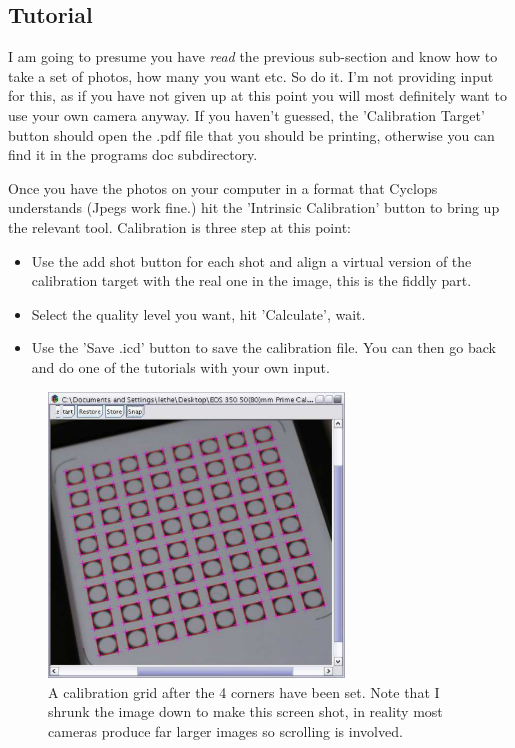 \documentclass[10pt,a4paper,twoside]{article}
\begin{document}
\subsection{Tutorial}

I am going to presume you have \emph{read} the previous sub-section and know how to take a set of photos, how many you want etc. So do it. I'm not providing input for this, as if you have not given up at this point you will most definitely want to use your own camera anyway. If you haven't guessed, the 'Calibration Target' button should open the .pdf file that you should be printing, otherwise you can find it in the programs doc subdirectory.

Once you have the photos on your computer in a format that Cyclops understands (Jpegs work fine.) hit the 'Intrinsic Calibration' button to bring up the relevant tool. Calibration is three step at this point:
\begin{itemize}
\item Use the add shot button for each shot and align a virtual version of the calibration target with the real one in the image, this is the fiddly part.
\item Select the quality level you want, hit 'Calculate', wait.
\item Use the 'Save .icd' button to save the calibration file. You can then go back and do one of the tutorials with your own input.
\end{itemize}

\begin{figure}
 \centering
 \includegraphics[width=0.7\textwidth]{screenshots/calib_grid}
 \caption{A calibration grid after the 4 corners have been set. Note that I shrunk the image down to make this screen shot, in reality most cameras produce far larger images so scrolling is involved.}
 \label{fig:calib_grid}
\end{figure}
\end{document}
